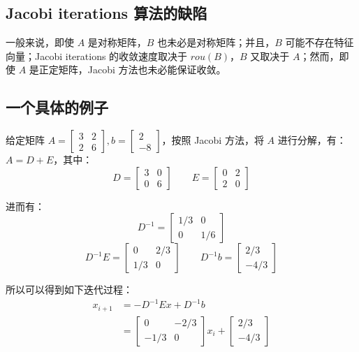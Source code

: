 \documentclass[12pt]{article}
\begin{document}
\subsection{Jacobi iterations 算法的缺陷}
一般来说，即使 $A$ 是对称矩阵，$B$ 也未必是对称矩阵；并且，$B$ 可能不存在特征向量；Jacobi iterations 的收敛速度取决于 $rou(B)$，$B$ 又取决于 $A$；然而，即使 $A$ 是正定矩阵，Jacobi 方法也未必能保证收敛。


\subsection{一个具体的例子}
给定矩阵 $A = \begin{bmatrix} 3 & 2 \\ 2 & 6 \end{bmatrix}, b = \begin{bmatrix} 2 \\ -8 \end{bmatrix}$，按照 Jacobi 方法，将 $A$ 进行分解，有：$A = D + E$，其中：
$$
D = \begin{bmatrix} 3 & 0 \\ 0 & 6\end{bmatrix} \qquad E = \begin{bmatrix} 0 & 2 \\ 2 & 0\end{bmatrix}
$$

进而有：
$$
D^{-1} = \begin{bmatrix} 1/3 & 0 \\ 0 & 1/6\end{bmatrix} 
$$
$$
D^{-1} E = \begin{bmatrix} 0 & 2/3 \\ 1/3 & 0\end{bmatrix} \qquad D^{-1} b = \begin{bmatrix} 2/3 \\ -4/3\end{bmatrix} 
$$

所以可以得到如下迭代过程：
\begin{align*}
x_{i+1} &= -D^{-1}Ex + D^{-1}b \\
          &= \begin{bmatrix} 0 & -2/3 \\ -1/3 & 0\end{bmatrix}x_i + \begin{bmatrix} 2/3 \\ -4/3\end{bmatrix}
\end{align*}
\end{document}
